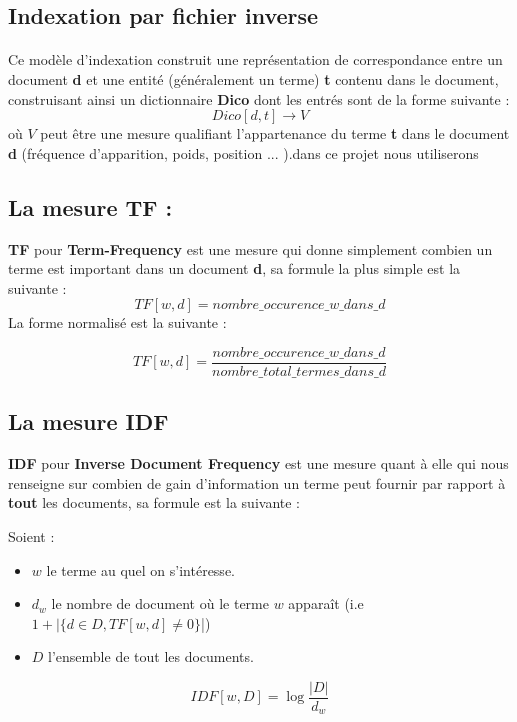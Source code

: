 \documentclass[12pt]{report}
\begin{document}
		\subsection{Indexation par fichier inverse}
		\paragraph{}
		Ce modèle d'indexation construit une représentation de correspondance entre un document 
		\textbf{d} et une entité (généralement un terme) \textbf{t} contenu dans le document,
		construisant ainsi un dictionnaire \textbf{Dico} dont les entrés sont de la forme suivante :
		\begin{equation*}
			Dico[d,t] \rightarrow V
		\end{equation*} 
		où $V$ peut être une mesure 
		qualifiant l'appartenance du terme \textbf{t} dans le document \textbf{d} (fréquence
		d'apparition, poids, position ... ).dans ce projet nous utiliserons 
		
		\subsection{La mesure TF : }
		\textbf{TF} pour \textbf{Term-Frequency} est une mesure qui donne simplement combien un terme
		est important dans un document \textbf{d}, sa formule la plus simple est la suivante  : 
		\begin{equation*}
			TF[w,d] = nombre\_occurence\_w\_dans\_d
		\end{equation*}
		La forme normalisé est la suivante : 
		
		\begin{equation*}
		TF[w,d] = \frac{nombre\_occurence\_w\_dans\_d}{nombre\_total\_termes\_dans\_d}
		\end{equation*}
		
		\subsection{La mesure IDF}
		\textbf{IDF} pour \textbf{Inverse Document Frequency} est une mesure quant à elle qui nous
		renseigne sur combien de gain d'information un terme peut fournir par rapport à \textbf{tout}
		les documents, sa formule est la suivante : \par
		Soient : 
		\begin{itemize}
			\item $w$ le terme au quel on s'intéresse.
			\item $d_w$ le nombre de document où le terme $w$ apparaît (i.e $1 + |\lbrace d \in D , TF[w,d] \neq 0 \rbrace $|)
			\item $D$ l'ensemble de tout les documents.
		\end{itemize}
		\begin{equation*}
			IDF[w,D] = \log{\frac{|D|}{d_w}}
		\end{equation*}
		
\end{document}
